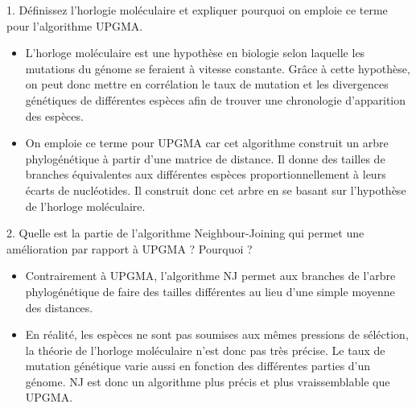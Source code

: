 \documentclass[
	12pt, %
]{fphw}
\begin{document}
\begin{problem}
	1. Définissez l'horlogie moléculaire et expliquer pourquoi on emploie ce terme pour l'algorithme UPGMA.
\end{problem}
\begin{center}
	\begin{itemize}
		\item L'horloge moléculaire est une hypothèse en biologie selon laquelle les mutations du génome se feraient à vitesse constante. Grâce à cette hypothèse, on peut donc mettre en corrélation le taux de mutation et les divergences génétiques de différentes espèces afin de trouver une chronologie d'apparition des espèces.
		\item On emploie ce terme pour UPGMA car cet algorithme construit un arbre phylogénétique à partir d'une matrice de distance. Il donne des tailles de branches équivalentes aux différentes espèces proportionnellement à leurs écarts de nucléotides. Il construit donc cet arbre en se basant sur l'hypothèse de l'horloge moléculaire.
	\end{itemize}
\end{center}

\begin{problem}
	2. Quelle est la partie de l'algorithme Neighbour-Joining qui permet une amélioration par rapport à UPGMA ? Pourquoi ?
\end{problem}
\begin{center}
	\begin{itemize}
		\item Contrairement à UPGMA, l'algorithme NJ permet aux branches de l'arbre phylogénétique de faire des tailles différentes au lieu d'une simple moyenne des distances. 
		\item En réalité, les espèces ne sont pas soumises aux mêmes pressions de séléction, la théorie de l'horloge moléculaire n'est donc pas très précise. Le taux de mutation génétique varie aussi en fonction des différentes parties d'un génome. NJ est donc un algorithme plus précis et plus vraissemblable que UPGMA.
	\end{itemize}
\end{center}
\end{document}
